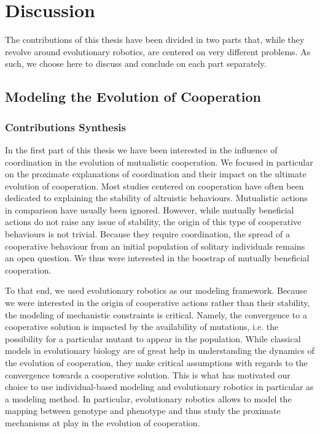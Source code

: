 \chapter{Discussion}


\minitoc[n] %

The contributions of this thesis have been divided in two parts that, while they revolve around evolutionary robotics, are centered on very different problems. As such, we choose here to discuss and conclude on each part separately.

\section{Modeling the Evolution of Cooperation}

	\subsection{Contributions Synthesis}

		In the first part of this thesis we have been interested in the influence of coordination in the evolution of mutualistic cooperation. We focused in particular on the proximate explanations of coordination and their impact on the ultimate evolution of cooperation. Most studies centered on cooperation have often been dedicated to explaining the stability of altruistic behaviours. Mutualistic actions in comparison have usually been ignored. However, while mutually beneficial actions do not raise any issue of stability, the origin of this type of cooperative behaviours is not trivial. Because they require coordination, the spread of a cooperative behaviour from an initial population of solitary individuals remains an open question. We thus were interested in the boostrap of mutually beneficial cooperation.

		To that end, we used evolutionary robotics as our modeling framework. Because we were interested in the origin of cooperative actions rather than their stability, the modeling of mechanistic constraints is critical. Namely, the convergence to a cooperative solution is impacted by the availability of mutations, i.e. the possibility for a particular mutant to appear in the population. While classical models in evolutionary biology are of great help in understanding the dynamics of the evolution of cooperation, they make critical assumptions with regards to the convergence towards a cooperative solution. This is what has motivated our choice to use individual-based modeling and evolutionary robotics in particular as a modeling method. In particular, evolutionary robotics allows to model the mapping between genotype and phenotype and thus study the proximate mechanisms at play in the evolution of cooperation.

